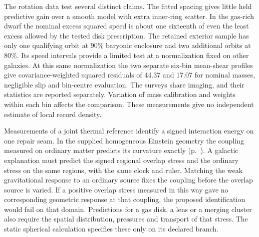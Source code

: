\documentclass[11pt]{article}
\begin{document}
The rotation data test several distinct claims. The fitted spacing gives
little held predictive gain over a smooth model with extra inner-ring
scatter. In the gas-rich dwarf the nominal excess squared speed is about
one sixteenth of even the least excess allowed by the tested disk
prescription. The retained exterior sample has only one qualifying orbit
at $90\%$ baryonic enclosure and two additional orbits at $80\%$.
Its speed intervals provide a limited test at a normalization fixed on
other galaxies. At this same normalization the two separate six-bin
mean-shear profiles give covariance-weighted squared residuals of 44.37
and 17.07 for nominal masses, negligible slip and bin-centre evaluation.
The surveys share imaging, and their statistics are reported separately.
Variation of mass calibration and weights within each bin affects the
comparison. These measurements give no independent estimate of local
record density.

Measurements of a joint thermal reference identify a signed interaction
energy on one repair seam. In the supplied homogeneous Einstein geometry
the coupling measured on ordinary matter predicts its curvature exactly
(p.~\pageref{par:seam-energy-test}).
A galactic explanation must predict the signed regional overlap stress and the
ordinary stress on the same regions, with the same clock and ruler.
Matching the weak gravitational response to an ordinary source fixes
the coupling before the overlap source is varied. If a positive
overlap stress measured in this way gave no corresponding geometric
response at that coupling, the proposed identification would fail on
that domain. Predictions for a gas disk, a lens or a merging cluster
also require the spatial distribution, pressures and transport of that
stress. The static spherical calculation specifies these only on its
declared branch.
\end{document}
